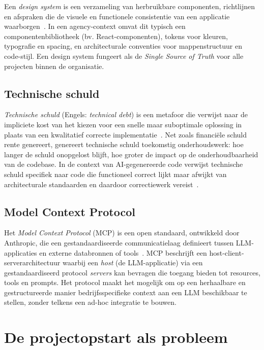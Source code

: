 Een \textit{design system} is een verzameling van herbruikbare componenten, richtlijnen en afspraken die de visuele en functionele consistentie van een applicatie waarborgen~\autocite{Fang2024}. In een agency-context omvat dit typisch een componentenbibliotheek (bv. React-componenten), tokens voor kleuren, typografie en spacing, en architecturale conventies voor mappenstructuur en code-stijl. Een design system fungeert als de \textit{Single Source of Truth} voor alle projecten binnen de organisatie.

\subsection{Technische schuld}
\label{subsec:technische-schuld}

\textit{Technische schuld} (Engels: \textit{technical debt}) is een metafoor die verwijst naar de impliciete kost van het kiezen voor een snelle maar suboptimale oplossing in plaats van een kwalitatief correcte implementatie~\autocite{Motiwala2026}. Net zoals financiële schuld rente genereert, genereert technische schuld toekomstig onderhoudswerk: hoe langer de schuld onopgelost blijft, hoe groter de impact op de onderhoudbaarheid van de codebase. In de context van AI-gegenereerde code verwijst technische schuld specifiek naar code die functioneel correct lijkt maar afwijkt van architecturale standaarden en daardoor correctiewerk vereist~\autocite{Veracode2025}.

\subsection{Model Context Protocol}
\label{subsec:mcp-terminologie}

Het \textit{Model Context Protocol} (MCP) is een open standaard, ontwikkeld door Anthropic, die een gestandaardiseerde communicatielaag definieert tussen LLM-applicaties en externe databronnen of tools~\autocite{GoogleCloud2024}. MCP beschrijft een host-client-serverarchitectuur waarbij een \textit{host} (de LLM-applicatie) via een gestandaardiseerd protocol \textit{servers} kan bevragen die toegang bieden tot resources, tools en prompts. Het protocol maakt het mogelijk om op een herhaalbare en gestructureerde manier bedrijfsspecifieke context aan een LLM beschikbaar te stellen, zonder telkens een ad-hoc integratie te bouwen.

\section{De projectopstart als probleem}
\label{sec:projectopstart-probleem}

